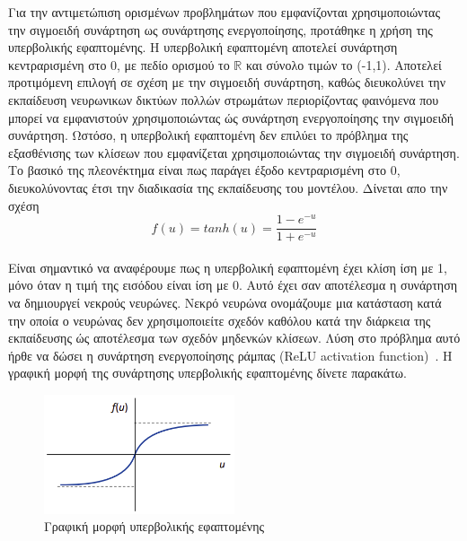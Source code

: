 \documentclass[12pt]{article}
\numberwithin{equation}{section}
\begin{document}
Για την αντιμετώπιση ορισμένων προβλημάτων που εμφανίζονται χρησιμοποιώντας την σιγμοειδή συνάρτηση ως συνάρτησης ενεργοποίησης, προτάθηκε η χρήση της υπερβολικής εφαπτομένης. Η υπερβολική εφαπτομένη αποτελεί συνάρτηση κεντραρισμένη στο 0, με πεδίο ορισμού το \(\mathbb{R}\) και σύνολο τιμών το (-1,1). Αποτελεί προτιμόμενη επιλογή σε σχέση με την σιγμοειδή συνάρτηση, καθώς διευκολύνει την εκπαίδευση νευρωνικων δικτύων πολλών στρωμάτων περιορίζοντας φαινόμενα που μπορεί να εμφανιστούν χρησιμοποιώντας ώς συνάρτηση ενεργοποίησης την σιγμοειδή συνάρτηση. Ωστόσο, η υπερβολική εφαπτομένη δεν επιλύει το πρόβλημα της εξασθένισης των κλίσεων που εμφανίζεται χρησιμοποιώντας την σιγμοειδή συνάρτηση. Το βασικό της πλεονέκτημα είναι πως παράγει έξοδο κεντραρισμένη στο 0, διευκολύνοντας έτσι την διαδικασία της εκπαίδευσης του μοντέλου. Δίνεται απο την σχέση \\

\begin{equation}
f(u) = tanh(u) = \frac{1 - e^{-u}}{1 + e^{-u}}
\end{equation}\\

Είναι σημαντικό να αναφέρουμε πως η υπερβολική εφαπτομένη έχει κλίση ίση με 1, μόνο όταν η τιμή της εισόδου είναι ίση με 0. Αυτό έχει σαν αποτέλεσμα η συνάρτηση να δημιουργεί νεκρούς νευρώνες. Νεκρό νευρώνα ονομάζουμε μια κατάσταση κατά την οποία ο νευρώνας δεν χρησιμοποιείτε σχεδόν καθόλου κατά την διάρκεια της εκπαίδευσης ώς αποτέλεσμα των σχεδόν μηδενκών κλίσεων. Λύση στο πρόβλημα αυτό ήρθε να δώσει η συνάρτηση ενεργοποίησης ράμπας (ReLU activation function)~\cite{nwankpa2018activationfunctionscomparisontrends}. Η γραφική μορφή της συνάρτησης υπερβολικής εφαπτομένης δίνετε παρακάτω.\\

\begin{figure}[h!]
  \centering
  \includegraphics[width=0.5\textwidth]{images/Tanh.png} %
  \caption{Γραφική μορφή υπερβολικής εφαπτομένης}
  \label{figure 13}
\end{figure} 
\end{document}
